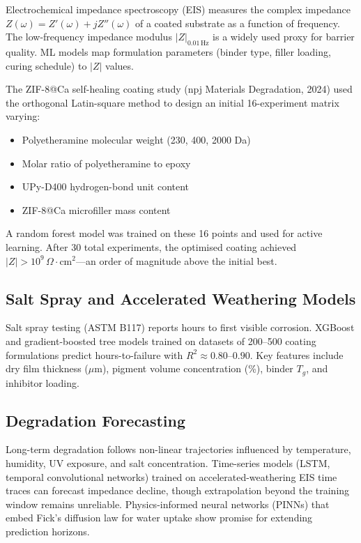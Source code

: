 \documentclass[11pt,a4paper]{article}
\begin{document}
Electrochemical impedance spectroscopy (EIS) measures the complex impedance $Z(\omega) = Z'(\omega) + jZ''(\omega)$ of a coated substrate as a function of frequency.
The low-frequency impedance modulus $|Z|_{0.01\,\text{Hz}}$ is a widely used proxy for barrier quality.
ML models map formulation parameters (binder type, filler loading, curing schedule) to $|Z|$ values.

The ZIF-8@Ca self-healing coating study (npj Materials Degradation, 2024) used the orthogonal Latin-square method to design an initial 16-experiment matrix varying:
\begin{itemize}[nosep]
  \item Polyetheramine molecular weight (230, 400, 2000 Da)
  \item Molar ratio of polyetheramine to epoxy
  \item UPy-D400 hydrogen-bond unit content
  \item ZIF-8@Ca microfiller mass content
\end{itemize}
A random forest model was trained on these 16 points and used for active learning.
After 30 total experiments, the optimised coating achieved $|Z| > 10^9\,\Omega\cdot\text{cm}^2$---an order of magnitude above the initial best.

\subsection{Salt Spray and Accelerated Weathering Models}

Salt spray testing (ASTM B117) reports hours to first visible corrosion.
XGBoost and gradient-boosted tree models trained on datasets of 200--500 coating formulations predict hours-to-failure with $R^2 \approx 0.80$--$0.90$.
Key features include dry film thickness ($\mu$m), pigment volume concentration (\%), binder $T_g$, and inhibitor loading.

\subsection{Degradation Forecasting}

Long-term degradation follows non-linear trajectories influenced by temperature, humidity, UV exposure, and salt concentration.
Time-series models (LSTM, temporal convolutional networks) trained on accelerated-weathering EIS time traces can forecast impedance decline, though extrapolation beyond the training window remains unreliable.
Physics-informed neural networks (PINNs) that embed Fick's diffusion law for water uptake show promise for extending prediction horizons.
\end{document}
